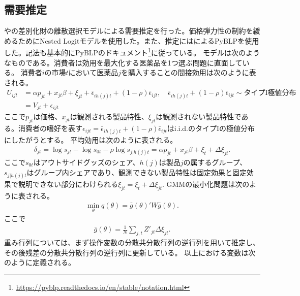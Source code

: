 \documentclass[a4paper,11pt,uplatex]{jsarticle}
\theoremstyle{definition}
\begin{document}
\subsection{需要推定}
\cite{Berry1994}や\cite{BLP}の差別化財の離散選択モデルによる需要推定を行った。価格弾力性の制約を緩めるためにNested Logitモデルを使用した。また、推定には\cite{ConlonGortmaker}によるPyBLPを使用した。記法も基本的にPyBLPのドキュメント\footnote{\url{https://pyblp.readthedocs.io/en/stable/notation.html}}に従っている。
モデルは次のようなものである。消費者は効用を最大化する医薬品を1つ選ぶ問題に直面している。
消費者\(i\)の市場\(t\)において医薬品\(j\)を購入することの間接効用は次のように表される。
\begin{align*}
U_{ijt}&=\alpha p_{jt} + x_{jt} \beta + \xi_{jt} + \bar\epsilon_{ih(j)t}+(1-\rho)\bar \epsilon_{ijt}, \quad \bar\epsilon_{ih(j)t}+(1-\rho) \bar \epsilon_{ijt} \sim \textrm{タイプI極値分布}\\
&=V_{jt}+\epsilon_{ijt}
\end{align*}
ここで\(p_{jt}\)は価格、\(x_{jt}\)は観測される製品特性、\(\xi_{jt}\)は観測されない製品特性である。消費者の嗜好を表す\(\epsilon_{ijt}=\bar\epsilon_{ih(j)t}+(1-\rho)\bar \epsilon_{ijt}\)はi.i.d.のタイプIの極値分布にしたがうとする。
平均効用は次のように表される。
\begin{align*}
\delta_{jt}=\log s_{jt}-\log s_{0t}-\rho \log s_{j | h(j)t}=\alpha p_{jt} + x_{jt} \beta +\xi_t+\Delta \xi_{jt}.
\end{align*}
ここで\(s_{0t}\)はアウトサイドグッズのシェア、\(h(j)\)は製品\(j\)の属するグループ、\(s_{j | h(j)t}\)はグループ内シェアであり、観測できない製品特性は固定効果と固定効果で説明できない部分にわけられる\(\xi_{jt}=\xi_t+\Delta \xi_{jt}\).
GMMの最小化問題は次のように表される。
\begin{align*}
\min_\theta q(\theta)=\bar g(\theta)'W \bar g(\theta).
\end{align*}
ここで
\begin{align*}
\bar g(\theta)=\frac{1}{N} \sum _{j,t} Z'_{jt} \Delta\xi_{jt}.
\end{align*}
重み行列については、まず操作変数の分散共分散行列の逆行列を用いて推定し、その後残差の分散共分散行列の逆行列に更新している。
以上における変数は次のように定義される。
\end{document}
